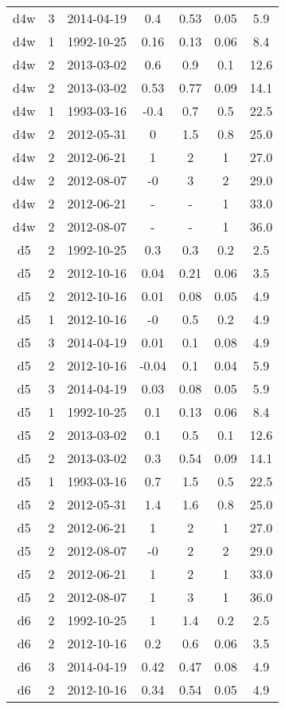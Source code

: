 \begin{table*}[htp]
\begin{tabular}{ccccccc}
d4w & 3 & 2014-04-19 & 0.4 & 0.53 & 0.05 & 5.9 \\
d4w & 1 & 1992-10-25 & 0.16 & 0.13 & 0.06 & 8.4 \\
d4w & 2 & 2013-03-02 & 0.6 & 0.9 & 0.1 & 12.6 \\
d4w & 2 & 2013-03-02 & 0.53 & 0.77 & 0.09 & 14.1 \\
d4w & 1 & 1993-03-16 & -0.4 & 0.7 & 0.5 & 22.5 \\
d4w & 2 & 2012-05-31 & 0 & 1.5 & 0.8 & 25.0 \\
d4w & 2 & 2012-06-21 & 1 & 2 & 1 & 27.0 \\
d4w & 2 & 2012-08-07 & -0 & 3 & 2 & 29.0 \\
d4w & 2 & 2012-06-21 & - & - & 1 & 33.0 \\
d4w & 2 & 2012-08-07 & - & - & 1 & 36.0 \\
d5 & 2 & 1992-10-25 & 0.3 & 0.3 & 0.2 & 2.5 \\
d5 & 2 & 2012-10-16 & 0.04 & 0.21 & 0.06 & 3.5 \\
d5 & 2 & 2012-10-16 & 0.01 & 0.08 & 0.05 & 4.9 \\
d5 & 1 & 2012-10-16 & -0 & 0.5 & 0.2 & 4.9 \\
d5 & 3 & 2014-04-19 & 0.01 & 0.1 & 0.08 & 4.9 \\
d5 & 2 & 2012-10-16 & -0.04 & 0.1 & 0.04 & 5.9 \\
d5 & 3 & 2014-04-19 & 0.03 & 0.08 & 0.05 & 5.9 \\
d5 & 1 & 1992-10-25 & 0.1 & 0.13 & 0.06 & 8.4 \\
d5 & 2 & 2013-03-02 & 0.1 & 0.5 & 0.1 & 12.6 \\
d5 & 2 & 2013-03-02 & 0.3 & 0.54 & 0.09 & 14.1 \\
d5 & 1 & 1993-03-16 & 0.7 & 1.5 & 0.5 & 22.5 \\
d5 & 2 & 2012-05-31 & 1.4 & 1.6 & 0.8 & 25.0 \\
d5 & 2 & 2012-06-21 & 1 & 2 & 1 & 27.0 \\
d5 & 2 & 2012-08-07 & -0 & 2 & 2 & 29.0 \\
d5 & 2 & 2012-06-21 & 1 & 2 & 1 & 33.0 \\
d5 & 2 & 2012-08-07 & 1 & 3 & 1 & 36.0 \\
d6 & 2 & 1992-10-25 & 1 & 1.4 & 0.2 & 2.5 \\
d6 & 2 & 2012-10-16 & 0.2 & 0.6 & 0.06 & 3.5 \\
d6 & 3 & 2014-04-19 & 0.42 & 0.47 & 0.08 & 4.9 \\
d6 & 2 & 2012-10-16 & 0.34 & 0.54 & 0.05 & 4.9 \\

\end{tabular}
\end{table*}
